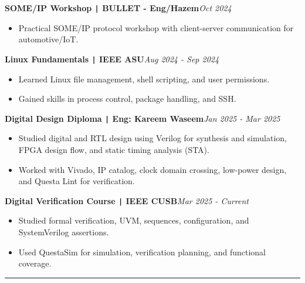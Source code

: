 \documentclass[11pt,a4paper]{article}
\begin{document}
\vspace{-0.5cm}
\begin{flushleft}
\textbf{SOME/IP Workshop \texttt{|} BULLET - Eng/Hazem}\hfill\textit{Oct 2024}\\
\end{flushleft}
\vspace{-0.7cm}
\begin{itemize}
\item \setlength{\itemsep}{-0.0em} Practical SOME/IP protocol workshop with client-server communication for automotive/IoT.
\end{itemize}
\vspace{-0.5cm}
\begin{flushleft}
\textbf{Linux Fundamentals \texttt{|} IEEE ASU}\hfill\textit{Aug 2024 - Sep 2024}\\
\end{flushleft}
\vspace{-0.7cm}
\begin{itemize}
\item \setlength{\itemsep}{-0.0em} Learned Linux file management, shell scripting, and user permissions.
\item \setlength{\itemsep}{-0.0em} Gained skills in process control, package handling, and SSH.
\end{itemize}
\vspace{-0.5cm}
\begin{flushleft}
\textbf{Digital Design Diploma \texttt{|} Eng: Kareem Waseem}\hfill\textit{Jan 2025 - Mar 2025}\\
\end{flushleft}
\vspace{-0.7cm}
\begin{itemize}
\item \setlength{\itemsep}{-0.0em} Studied digital and RTL design using Verilog for synthesis and simulation, FPGA design flow, and static timing analysis (STA).
\item \setlength{\itemsep}{-0.0em} Worked with Vivado, IP catalog, clock domain crossing, low-power design, and Questa Lint for verification.
\end{itemize}
\vspace{-0.5cm}
\begin{flushleft}
\textbf{Digital Verification Course \texttt{|} IEEE CUSB}\hfill\textit{Mar 2025 - Current}\\
\end{flushleft}
\vspace{-0.7cm}
\begin{itemize}
\item \setlength{\itemsep}{-0.0em} Studied formal verification, UVM, sequences, configuration, and SystemVerilog assertions.
\item \setlength{\itemsep}{-0.0em} Used QuestaSim for simulation, verification planning, and functional coverage.
\end{itemize}
\vspace{-0.5cm}
\vspace{-0.1cm}
\rule{\textwidth}{0.3pt}\\
\vspace{-0.5cm}
\centering
\end{document}
